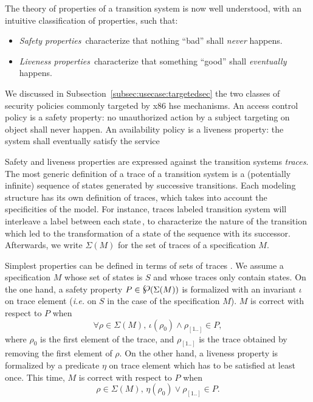 The theory of properties of a transition system is now well understood, with an
intuitive classification of properties, such that:
%
\begin{itemize}
\item \emph{Safety properties}\,\cite{lamport1977proving,lamport1985logical}
  characterize that nothing ``bad'' shall \emph{never} happens.
\item \emph{Liveness properties}\,\cite{lamport1985logical,alpern1985liveness}
  characterize that something ``good'' shall \emph{eventually} happens.
\end{itemize}

We discussed in Subsection~\ref{subsec:usecase:targetedsec} the two classes of
security policies commonly targeted by x86 \ac{hse} mechanisms.
%
An access control policy is a safety property: no unauthorized action by a
subject targeting on object shall never happen.
%
An availability policy is a liveness property: the system shall eventually
satisfy the service

Safety and liveness properties are expressed against the transition systems
\emph{traces}.
%
The most generic definition of a trace of a transition system is a (potentially
infinite) sequence of states generated by successive transitions.
%
Each modeling structure has its own definition of traces, which takes into
account the specificities of the model.
%
For instance, traces labeled transition system will interleave a label between
each state\,\cite{vijayaraghavan2015modular}, to characterize the nature of the
transition which led to the transformation of a state of the sequence with its
successor.
%
Afterwards, we write \( \Sigma(M) \) for the set of traces of a specification
\( M \).

Simplest properties can be defined in terms of sets of
traces\,\cite{schneider2000enforceable,basin2013enforceable}\,.
%
We assume a specification \( M \) whose set of states is \( S \) and whose
traces only contain states.
%
On the one hand, a safety property \( P \in \powerset(\Sigma(M)) \) is
formalized with an invariant \( \iota \) on trace element (\emph{i.e.} on
\( S \) in the case of the specification \( M \)).
%
\( M \) is correct with respect to \( P \) when
%
\[
  \forall \rho \in \Sigma(M)\text{, } \iota(\rho_0) \wedge \rho_{[1..]} \in P,
\]
%
where \( \rho_0 \) is the first element of the trace, and \( \rho_{[1..]} \) is
the trace obtained by removing the first element of \( \rho \).
%
On the other hand, a liveness property is formalized by a predicate \( \eta \)
on trace element which has to be satisfied at least once.
%
This time, \( M \) is correct with respect to \( P \) when
%
\[
  \rho \in \Sigma(M)\text{, } \eta(\rho_0) \vee \rho_{[1..]} \in P.
\]
%

